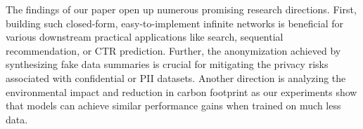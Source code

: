\documentclass{article}
\begin{document}
The findings of our paper open up numerous promising research directions. First, building such closed-form, easy-to-implement infinite networks is beneficial for various downstream practical applications like search, sequential recommendation, or CTR prediction. Further, the anonymization achieved by synthesizing fake data summaries is crucial for mitigating the privacy risks associated with confidential or PII datasets. Another direction is analyzing the environmental impact and reduction in carbon footprint as our experiments show that models can achieve similar performance gains when trained on much 
less
data. 
\end{document}
